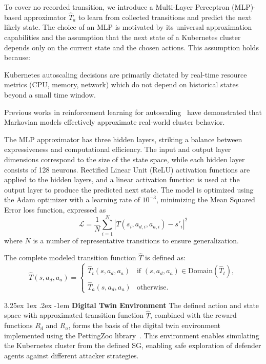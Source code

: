 \documentclass[conference]{IEEEtran}
\makeatletter
\renewcommand\paragraph{\@startsection{paragraph}{5}{\z@}%
  {3.25ex \@plus1ex \@minus.2ex}%
  {-1em}%
  {\normalfont\normalsize\bfseries}}
\makeatother
\begin{document}
To cover no recorded transition, we introduce a Multi-Layer Perceptron (MLP)-based approximator $\hat{T}_a$ to learn from collected transitions and predict the next likely state. The choice of an MLP is motivated by its universal approximation capabilities and the assumption that the next state of a Kubernetes cluster depends only on the current state and the chosen actions. This assumption holds because:
\begin{enumerate*}[label={\roman*)}, itemjoin={;\quad }]
    \item Kubernetes autoscaling decisions are primarily dictated by real-time resource metrics (CPU, memory, network) which do not depend on historical states beyond a small time window.
    \item Previous works in reinforcement learning for autoscaling~\cite{Gari2021} have demonstrated that Markovian models effectively approximate real-world cluster behavior.
\end{enumerate*}
The MLP approximator has three hidden layers, striking a balance between expressiveness and computational efficiency. The input and output layer dimensions correspond to the size of the state space, while each hidden layer consists of 128 neurons. Rectified Linear Unit (ReLU) activation functions are applied to the hidden layers, and a linear activation function is used at the output layer to produce the predicted next state. The model is optimized using the Adam optimizer with a learning rate of $10^{-3}$, minimizing the Mean Squared Error loss function, expressed as
$$
\mathcal{L} = \frac{1}{N} \sum_{i=1}^N |T(s_i, a_{d,i}, a_{a,i}) - s'_i|^2
$$
where $N$ is a number of representative transitions to ensure generalization.

The complete modeled transition function $\hat{T}$ is defined as:
$$
\hat{T}(s, a_d, a_a) = 
\begin{cases} 
\hat{T}_t(s, a_d, a_a) & \text{if } (s, a_d, a_a) \in \text{Domain}(\hat{T}_t), \\
\hat{T}_a(s, a_d, a_a) & \text{otherwise}.
\end{cases}
$$

\noindent \paragraph{\textbf{Digital Twin Environment}} The defined action and state space with approximated transition function $\hat{T}$, combined with the reward functions $R_d$ and $R_a$, forms the basis of the digital twin environment implemented using the PettingZoo library~\cite{Terry2021}. This environment enables simulating the Kubernetes cluster from the defined SG, enabling safe exploration of defender agents against different attacker strategies.
\end{document}
